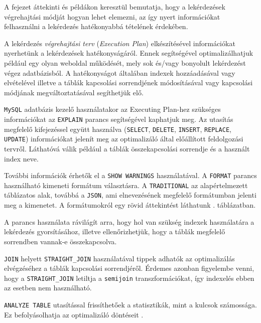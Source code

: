 
A fejezet áttekinti és példákon keresztül bemutatja, hogy a lekérdezések végrehajtási módját hogyan lehet elemezni, az így nyert információkat felhasználni a lekérdezés hatékonyabbá tételének érdekében.

A lekérdezés \textit{végrehajtási terv} (\textit{Execution Plan}) elkészítésével információkat nyerhetünk a lekérdezések hatékonyságáról. Ennek segítségével optimalizálhatjuk például egy olyan weboldal működését, mely sok és/vagy bonyolult lekérdezést végez adatbázisból. A hatékonyságot általában indexek hozzáadásával vagy elvételével illetve a táblák kapcsolási sorrendjének módosításával vagy kapcsolási módjának megváltoztatásával segíthetjük elő.


\texttt{MySQL} adatbázis kezelő használatakor az Executing Plan-hez szükséges információkat az \texttt{EXPLAIN} parancs segítségével kaphatjuk meg.
Az utasítás megfelelő kifejezéssel együtt használva (\texttt{SELECT}, \texttt{DELETE}, \texttt{INSERT}, \texttt{REPLACE}, \texttt{UPDATE})  információkat jelenít meg az optimalizáló által előállított feldolgozási tervről. Láthatóvá válik például a táblák összekapcsolási sorrendje és a használt index neve.

További információk érhetők el a \texttt{SHOW WARNINGS} használatával.
A \texttt{FORMAT} parancs használható kimeneti formátum választásra. A \texttt{TRADITIONAL} az alapértelmezett táblázatos alak, továbbá a \texttt{JSON}, ami elnevezésének megfelelő formátumban jelenti meg a kimenetet. A formátumokról egy rövid áttekintést láthatunk . táblázatban.

A parancs használata rávilágít arra, hogy hol van szükség indexek használatára a lekérdezés gyorsításához, illetve ellenőrizhetjük, hogy a táblák megfelelő sorrendben vannak-e összekapcsolva. 

\texttt{JOIN} helyett \texttt{STRAIGHT\_JOIN} használatával tippek adhatók az optimalizálás elvégzéséhez a táblák kapcsolási sorrendjéről. Érdemes azonban figyelembe venni, hogy a \texttt{STRAIGHT\_JOIN} letiltja a \texttt{semijoin} transzformációkat, így indexelés ebben az esetben nem használható.

\texttt{ANALYZE TABLE} utasítással frissíthetőek a statisztikák, mint a kulcsok számossága. Ez befolyásolhatja az optimalizáló döntéseit \cite{explain}.


